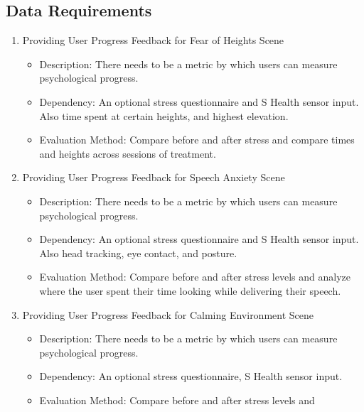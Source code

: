 \documentclass[a4paper,10pt]{article}
\begin{document}
	\subsection{Data Requirements}
	\begin{enumerate}
	\item Providing User Progress Feedback for Fear of Heights Scene
	\begin{itemize}
	  \item Description: There needs to be a metric by which users can measure psychological progress.
	  \item Dependency: An optional stress questionnaire and S Health sensor input. Also time spent at certain heights, and highest elevation.
	  \item Evaluation Method: Compare before and after stress and compare times and heights across sessions of treatment.
	\end{itemize}
	\item Providing User Progress Feedback for Speech Anxiety Scene
	\begin{itemize}
		\item Description: There needs to be a metric by which users can measure psychological progress.
	  \item Dependency: An optional stress questionnaire and S Health sensor input. Also head tracking, eye contact, and posture.
		\item Evaluation Method: Compare before and after stress levels and analyze where the user spent their time looking while delivering their speech.
	\end{itemize}
	\item Providing User Progress Feedback for Calming Environment Scene
	\begin{itemize}
		\item Description: There needs to be a metric by which users can measure psychological progress.
		\item Dependency: An optional stress questionnaire, S Health sensor input.
		\item Evaluation Method: Compare before and after stress levels and 
	\end{itemize}	
	\end{enumerate}
	
\end{document}
